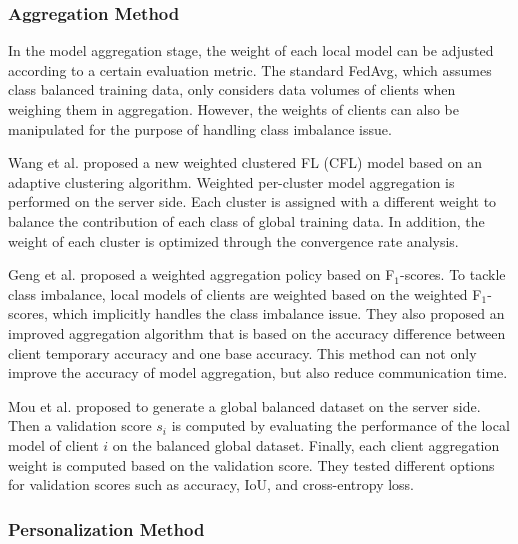 \documentclass[10pt,journal,compsoc]{IEEEtran}
\begin{document}
\subsubsection{Aggregation Method}
In the model aggregation stage, the weight of each local model can be adjusted according to a certain evaluation metric. The standard FedAvg, which assumes class balanced training data, only considers data volumes of clients when weighing them in aggregation. However, the weights of clients can also be manipulated for the purpose of handling class imbalance issue.

Wang et al. \cite{wang2021adaptive} proposed a new weighted clustered FL (CFL) model based on an adaptive clustering algorithm. Weighted per-cluster model aggregation is performed on the server side. Each cluster is assigned with a different weight to balance the contribution of each class of global training data. In addition, the weight of each cluster is optimized through the convergence rate analysis. 

Geng et al. \cite{geng2022bearing} proposed a weighted aggregation policy based on F$_1$-scores. To tackle class imbalance, local models of clients are weighted based on the weighted F$_1$-scores, which implicitly handles the class imbalance issue. They also proposed an improved aggregation algorithm that is based on the accuracy difference between client temporary accuracy and one base accuracy. This method can not only improve the accuracy of model aggregation, but also reduce communication time. 

Mou et al. \cite{mou2021optimized} proposed to generate a global balanced dataset on the server side. Then a validation score $ s_{i} $ is computed by evaluating the performance of the local model of client $ i $ on the balanced global dataset. Finally, each client aggregation weight is computed based on the validation score. They tested different options for validation scores such as accuracy, IoU, and cross-entropy loss. 
\vspace{-0.2cm}

\subsubsection{Personalization Method}
\end{document}
